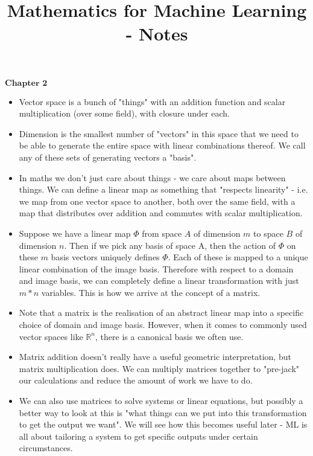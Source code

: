 \documentclass{article}
\begin{document}
\title{Mathematics for Machine Learning - Notes}

\maketitle

$\textbf{Chapter 2}$
\begin{itemize}
	
	\item Vector space is a bunch of "things" with an addition function and scalar multiplication (over some field), with closure under each.
	
	\item Dimension is the smallest number of "vectors" in this space that we need to be able to generate the entire space with linear combinations thereof. We call any of these sets of generating vectors a "basis".
	
	\item In maths we don't just care about things - we care about maps between things. We can define a linear map as something that "respects linearity" - i.e. we map from one vector space to another, both over the same field, with a map that distributes over addition and commutes with scalar multiplication.
	
	\item Suppose we have a linear map $\Phi$ from space $A$ of dimension $m$ to space $B$ of dimension $n$. Then if we pick any basis of space A, then the action of $\Phi$ on these $m$ basis vectors uniquely defines $\Phi$. Each of these is mapped to a unique linear combination of the image basis. Therefore with respect to a domain and image basis, we can completely define a linear transformation with just $m*n$ variables. This is how we arrive at the concept of a matrix.
	
	\item Note that a matrix is the realisation of an abstract linear map into a specific choice of domain and image basis. However, when it comes to commonly used vector spaces like $\mathbb{R}^n$, there is a canonical basis we often use.
	
	\item Matrix addition doesn't really have a useful geometric interpretation, but matrix multiplication does. We can multiply matrices together to "pre-jack" our calculations and reduce the amount of work we have to do.
	
	\item We can also use matrices to solve systems or linear equations, but possibly a better way to look at this is "what things can we put into this transformation to get the output we want". We will see how this becomes useful later - ML is all about tailoring a system to get specific outputs under certain circumstances.
	

\end{itemize}
\end{document}
